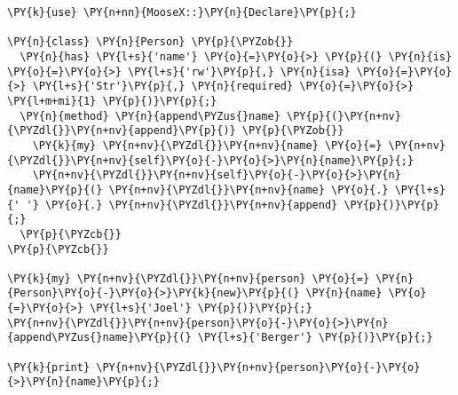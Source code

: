 \begin{Verbatim}[commandchars=\\\{\}]
\PY{k}{use} \PY{n+nn}{MooseX::}\PY{n}{Declare}\PY{p}{;}

\PY{n}{class} \PY{n}{Person} \PY{p}{\PYZob{}}
  \PY{n}{has} \PY{l+s}{'name'} \PY{o}{=}\PY{o}{>} \PY{p}{(} \PY{n}{is} \PY{o}{=}\PY{o}{>} \PY{l+s}{'rw'}\PY{p}{,} \PY{n}{isa} \PY{o}{=}\PY{o}{>} \PY{l+s}{'Str'}\PY{p}{,} \PY{n}{required} \PY{o}{=}\PY{o}{>} \PY{l+m+mi}{1} \PY{p}{)}\PY{p}{;}
  \PY{n}{method} \PY{n}{append\PYZus{}name} \PY{p}{(}\PY{n+nv}{\PYZdl{}}\PY{n+nv}{append}\PY{p}{)} \PY{p}{\PYZob{}}
    \PY{k}{my} \PY{n+nv}{\PYZdl{}}\PY{n+nv}{name} \PY{o}{=} \PY{n+nv}{\PYZdl{}}\PY{n+nv}{self}\PY{o}{-}\PY{o}{>}\PY{n}{name}\PY{p}{;}
    \PY{n+nv}{\PYZdl{}}\PY{n+nv}{self}\PY{o}{-}\PY{o}{>}\PY{n}{name}\PY{p}{(} \PY{n+nv}{\PYZdl{}}\PY{n+nv}{name} \PY{o}{.} \PY{l+s}{' '} \PY{o}{.} \PY{n+nv}{\PYZdl{}}\PY{n+nv}{append} \PY{p}{)}\PY{p}{;}
  \PY{p}{\PYZcb{}}
\PY{p}{\PYZcb{}}

\PY{k}{my} \PY{n+nv}{\PYZdl{}}\PY{n+nv}{person} \PY{o}{=} \PY{n}{Person}\PY{o}{-}\PY{o}{>}\PY{k}{new}\PY{p}{(} \PY{n}{name} \PY{o}{=}\PY{o}{>} \PY{l+s}{'Joel'} \PY{p}{)}\PY{p}{;}
\PY{n+nv}{\PYZdl{}}\PY{n+nv}{person}\PY{o}{-}\PY{o}{>}\PY{n}{append\PYZus{}name}\PY{p}{(} \PY{l+s}{'Berger'} \PY{p}{)}\PY{p}{;}

\PY{k}{print} \PY{n+nv}{\PYZdl{}}\PY{n+nv}{person}\PY{o}{-}\PY{o}{>}\PY{n}{name}\PY{p}{;}
\end{Verbatim}
